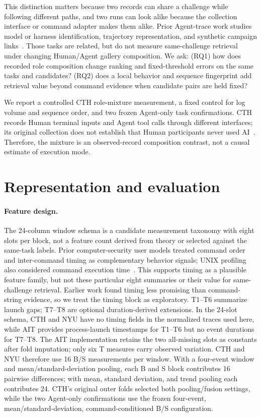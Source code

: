 \documentclass[10pt]{article}
\begin{document}
This distinction matters because two records can share a challenge while following different paths, and two runs can look alike because the collection interface or command adapter makes them alike. Prior Agent-trace work studies model or harness identification, trajectory representation, and synthetic campaign links~\cite{trace,lidar,procgrep,crossagent}. Those tasks are related, but do not measure same-challenge retrieval under changing Human/Agent gallery composition. We ask: (RQ1) how does recorded role composition change ranking and fixed-threshold errors on the same tasks and candidates? (RQ2) does a local behavior and sequence fingerprint add retrieval value beyond command evidence when candidate pairs are held fixed?

We report a controlled CTH role-mixture measurement, a fixed control for log volume and sequence order, and two frozen Agent-only task confirmations. CTH records Human terminal inputs and Agent tool calls through different interfaces; its original collection does not establish that Human participants never used AI~\cite{cthstudy}. Therefore, the mixture is an observed-record composition contrast, not a causal estimate of execution mode.

\section{Representation and evaluation}
\paragraph{Feature design.} The 24-column window schema is a candidate measurement taxonomy with eight slots per block, not a feature count derived from theory or selected against the same-task labels. Prior computer-security user models treated command order and inter-command timing as complementary behavior signals; UNIX profiling also considered command execution time~\cite{mcmahon,dao}. This supports timing as a plausible feature family, but not these particular eight summaries or their value for same-challenge retrieval. Earlier work found timing less promising than command-string evidence, so we treat the timing block as exploratory. T1--T6 summarize launch gaps; T7--T8 are optional duration-derived extensions. In the 24-slot schema, CTH and NYU have no timing fields in the normalized traces used here, while AIT provides process-launch timestamps for T1--T6 but no event durations for T7--T8. The AIT implementation retains the two all-missing slots as constants after fold imputation; only six T measures carry observed variation. CTH and NYU therefore use 16 B/S measurements per window. With a four-event window and mean/standard-deviation pooling, each B and S block contributes 16 pairwise differences; with mean, standard deviation, and trend pooling each contributes 24. CTH's original outer folds selected both pooling/fusion settings, while the two Agent-only confirmations use the frozen four-event, mean/standard-deviation, command-conditioned B/S configuration.
\end{document}
